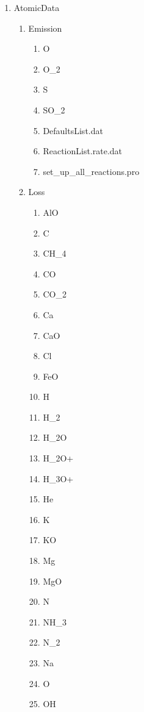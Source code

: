 \documentclass[11pt]{article}
\begin{document}
\begin{enumerate}
\item {\color{blue}AtomicData}
  \begin{enumerate}
  \item{\color{blue}Emission}
    \begin{enumerate}
    \item {\color{blue}O}
    \item {\color{blue}O\_2}
    \item {\color{blue}S}
    \item {\color{blue}SO\_2}
    \item {\color{red}DefaultsList.dat}
    \item {\color{red}ReactionList.rate.dat}
    \item set\_up\_all\_reactions.pro
    \end{enumerate}
  \item{\color{blue}Loss}
    \begin{enumerate}
    \item {\color{blue}AlO}
    \item {\color{blue}C}
    \item {\color{blue}CH\_4}
    \item {\color{blue}CO}
    \item {\color{blue}CO\_2}
    \item {\color{blue}Ca}
    \item {\color{blue}CaO}
    \item {\color{blue}Cl}
    \item {\color{blue}FeO}
    \item {\color{blue}H}
    \item {\color{blue}H\_2}
    \item {\color{blue}H\_2O}
    \item {\color{blue}H\_2O+}
    \item {\color{blue}H\_3O+}
    \item {\color{blue}He}
    \item {\color{blue}K}
    \item {\color{blue}KO}
    \item {\color{blue}Mg}
    \item {\color{blue}MgO}
    \item {\color{blue}N}
    \item {\color{blue}NH\_3}
    \item {\color{blue}N\_2}
    \item {\color{blue}Na}
    \item {\color{blue}O}
    \item {\color{blue}OH}

\end{enumerate}
\end{enumerate}
\end{enumerate}
\end{document}
